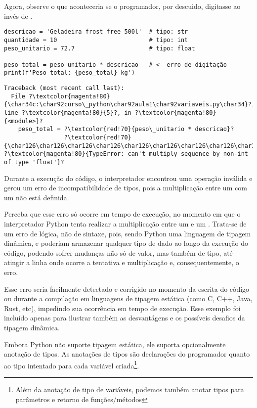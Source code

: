 Agora, observe o que aconteceria se o programador, por descuido, digitasse  ao invés
de .
\begin{verbatim}
descricao = 'Geladeira frost free 500l'  # tipo: str
quantidade = 10                          # tipo: int
peso_unitario = 72.7                     # tipo: float

peso_total = peso_unitario * descricao   # <- erro de digitação
print(f'Peso total: {peso_total} kg')
\end{verbatim}
%
\begin{verbatim}
Traceback (most recent call last):
  File ?\textcolor{magenta!80}{\char34c:\char92curso\_python\char92aula1\char92variaveis.py\char34}?, line ?\textcolor{magenta!80}{5}?, in ?\textcolor{magenta!80}{<module>}?
    peso_total = ?\textcolor{red!70}{peso\_unitario * descricao}?
                 ?\textcolor{red!70}{\char126\char126\char126\char126\char126\char126\char126\char126\char126\char126\char126\char126\char126\char126\char94\char126\char126\char126\char126\char126\char126\char126\char126\char126\char126}?
?\textcolor{magenta!80}{TypeError: can't multiply sequence by non-int of type 'float'}?
\end{verbatim}

Durante a execução do código, o interpretador encontrou uma operação inválida e gerou um erro de incompatibilidade
de tipos, pois a multiplicação entre um  com um  não está definida.

Perceba que esse erro só ocorre em tempo de execução, no momento em que o interpretador Python tenta realizar a
multiplicação entre um  e um .
Trata-se de um erro de lógica, não de sintaxe, pois, sendo Python uma linguagem de tipagem dinâmica,
 e  poderiam armazenar qualquer tipo de dado ao longo da execução do código,
podendo sofrer mudanças não só de valor, mas também de tipo, até atingir a linha onde ocorre a tentativa e
multiplicação e, consequentemente, o erro.

Esse erro seria facilmente detectado e corrigido no momento da escrita do código ou durante a compilação em
linguagens de tipagem estática (como C, C++, Java, Rust, etc), impedindo sua ocorrência em tempo de execução.
Esse exemplo foi incluído apenas para ilustrar também as desvantágens e os possíveis desafios da tipagem dinâmica.

Embora Python não suporte tipagem estática, ele suporta opcionalmente anotação de tipos.
As anotações de tipos são declarações do programador quanto ao tipo intentado para cada variável
criada\footnote{Além da anotação de tipo de variáveis, podemos também anotar tipos para parâmetros e retorno de
funções/métodos}.

